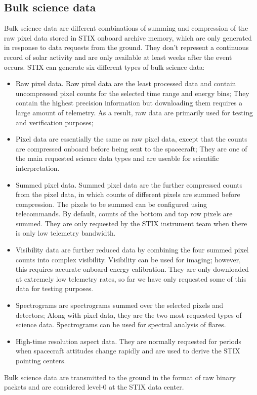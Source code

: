 \documentclass[referee]{aa} %
\begin{document}
\subsection{Bulk science data }
Bulk science data are different combinations of summing and compression of the raw pixel data stored in STIX onboard archive memory, which are only generated in response to 
data requests from the ground.  They don't represent a continuous record of solar activity and are only available at least weeks after the event occurs. 
STIX can generate six different types of bulk science data: 
\begin{itemize}
 \item Raw pixel data. 
 Raw pixel data are the least processed data and contain uncompressed pixel counts for the selected  time range and energy bins;   They contain the highest  precision information but downloading them requires a large amount of telemetry. As a result, raw data are primarily used for testing and verification purposes; 
\item Pixel data are essentially the same as raw pixel data,  except that the counts are compressed onboard before being sent to the spacecraft;  They are one of the main requested science data types and are useable for scientific interpretation. 
\item Summed pixel data.  Summed pixel data are the further compressed counts from the pixel data, in which counts of different pixels are summed before compression. The pixels to be summed can be configured using telecommands. By default, counts of the bottom and top row pixels are summed.  They are only requested by the STIX instrument team when there is only low telemetry bandwidth. 
\item Visibility data are further reduced data by combining the four summed pixel counts into complex visibility. Visibility can be used for imaging; however, this requires accurate onboard energy calibration. They are only downloaded at extremely low telemetry rates, so far we have only requested some of this data for testing purposes.
\item Spectrograms are spectrograms summed over the selected pixels and detectors;  Along with pixel data, they are the two most requested types of science data. Spectrograms can be used for spectral analysis of flares. 
\item High-time resolution aspect data. 
They are normally requested for periods when spacecraft attitudes change rapidly and are used to derive the STIX pointing centers. 
\end{itemize}
Bulk science data are transmitted to the ground in the format of raw binary packets and are considered level-0 at the STIX data center.  
\end{document}
